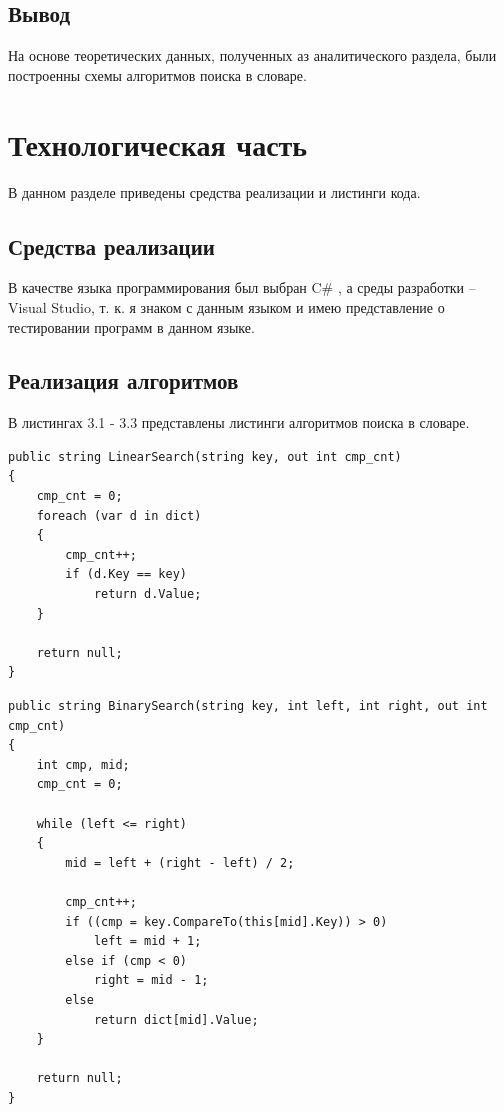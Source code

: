 \documentclass[12pt]{report}
\begin{document}
\section*{Вывод}

На основе теоретических данных, полученных аз аналитического раздела, были построенны схемы алгоритмов поиска в словаре.

\chapter{Технологическая часть}

В данном разделе приведены средства реализации и листинги кода.

\section{Средства реализации}

В качестве языка программирования был выбран C\# \cite{Microsoft}, а среды разработки -- Visual Studio\cite{VS}, т. к. я знаком с данным языком и имею представление о тестировании программ в данном языке.

\section{Реализация алгоритмов}

В листингах 3.1 - 3.3 представлены листинги алгоритмов поиска в словаре.

\captionsetup{singlelinecheck = false, justification=raggedright}
\begin{lstlisting}[label=some-code,caption=Алгоритм полного перебора]
public string LinearSearch(string key, out int cmp_cnt)
{
	cmp_cnt = 0;
	foreach (var d in dict)
	{
		cmp_cnt++;
		if (d.Key == key)
			return d.Value;
	}
	
	return null;
}
\end{lstlisting}

\newpage
\begin{lstlisting}[label=some-code,caption=Алгоритм двоичного поиска]
public string BinarySearch(string key, int left, int right, out int cmp_cnt)
{
	int cmp, mid;
	cmp_cnt = 0;
	
	while (left <= right)
	{
		mid = left + (right - left) / 2;
		
		cmp_cnt++;
		if ((cmp = key.CompareTo(this[mid].Key)) > 0)
			left = mid + 1;
		else if (cmp < 0)
			right = mid - 1;
		else
			return dict[mid].Value;
	}
	
	return null;
}
\end{lstlisting}
\end{document}
